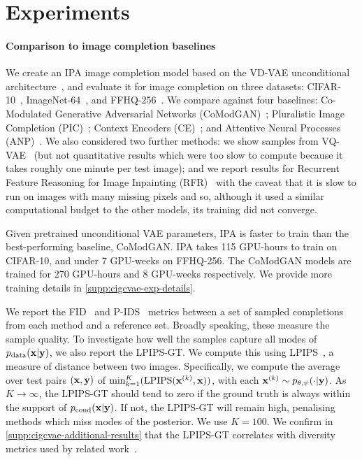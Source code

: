 \section{Experiments} \label{sec:cigcvae-experiments}

\paragraph{Comparison to image completion baselines}

We create an IPA image completion model based on the VD-VAE unconditional
architecture~\citep{child2020very}, and evaluate it for image completion on
three datasets: CIFAR-10~\citep{krizhevsky2009learning},
ImageNet-64~\citep{deng2009imagenet}, and FFHQ-256~\citep{karras2019style}. We
compare against four baselines: Co-Modulated Generative Adversarial Networks
(CoModGAN)~\citep{zhao2021large}; Pluralistic Image Completion
(PIC)~\citep{zheng2019pluralistic}; Context Encoders
(CE)~\citep{pathak2016context}; and Attentive Neural Processes
(ANP)~\citep{kim2019attentive}. We also considered two further methods: we show
samples from VQ-VAE~\citep{peng2021generating} (but not quantitative results
which were too slow to compute because it takes roughly one minute per test
image); and we report results for Recurrent Feature Reasoning for Image
Inpainting (RFR)~\citep{li2020recurrent} with the caveat that it is slow to run
on images with many missing pixels and so, although it used a similar
computational budget to the other models, its training did not converge.

Given pretrained unconditional VAE parameters, IPA is faster to train than the
best-performing baseline, CoModGAN. IPA takes 115 GPU-hours to train on
CIFAR-10, and under 7 GPU-weeks on FFHQ-256. The CoModGAN models are trained for
270 GPU-hours and 8 GPU-weeks respectively. We provide more training details in
\cref{supp:cigcvae-exp-details}.

We report the FID~\citep{heusel2017gans} and P-IDS~\citep{zhao2021large} metrics
between a set of sampled completions from each method and a reference set.
Broadly speaking, these measure the sample quality.
%
To investigate how well the samples capture all modes of
$p_{\rm{data}}({\mathbf{x}}|{\mathbf{y}})$, we also report the LPIPS-GT. We compute this using
LPIPS~\citep{zhang2018unreasonable}, a measure of distance between two images.
Specifically, we compute the average over test pairs $({\mathbf{x}}, {\mathbf{y}})$ of
$\min_{k=1}^K(\text{LPIPS}({\mathbf{x}}^{(k)} , {\mathbf{x}}))$, with each ${\mathbf{x}}^{(k)} \sim
p_{\theta,\psi}(\cdot | {\mathbf{y}})$. As $K \rightarrow \infty$, the LPIPS-GT should tend
to zero if the ground truth is always within the support of
$p_{\text{cond}}({\mathbf{x}}|{\mathbf{y}})$. If not, the LPIPS-GT will remain high, penalising
methods which miss modes of the posterior. We use $K=100$. We confirm in
\cref{supp:cigcvae-additional-results} that the LPIPS-GT correlates with diversity
metrics used by related work~\citep{zhu2017toward,li2020multimodal}.


